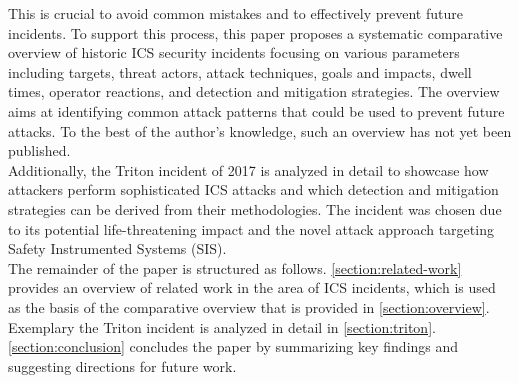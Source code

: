 \documentclass[runningheads]{llncs}
\begin{document}
This is crucial to avoid common mistakes and to effectively prevent future incidents.
To support this process, this paper proposes a systematic comparative overview of historic ICS security incidents focusing on various parameters including targets, threat actors, attack techniques, goals and impacts, dwell times, operator reactions, and detection and mitigation strategies.
The overview aims at identifying common attack patterns that could be used to prevent future attacks.
To the best of the author's knowledge, such an overview has not yet been published.\\
Additionally, the Triton incident of 2017 is analyzed in detail to showcase how attackers perform sophisticated ICS attacks and which detection and mitigation strategies can be derived from their methodologies.
The incident was chosen due to its potential life-threatening impact and the novel attack approach targeting Safety Instrumented Systems (SIS).\\

The remainder of the paper is structured as follows.
\autoref{section:related-work} provides an overview of related work in the area of ICS incidents, which is used as the basis of the comparative overview that is provided in \autoref{section:overview}.
Exemplary the Triton incident is analyzed in detail in \autoref{section:triton}.
\autoref{section:conclusion} concludes the paper by summarizing key findings and suggesting directions for future work.
\end{document}
